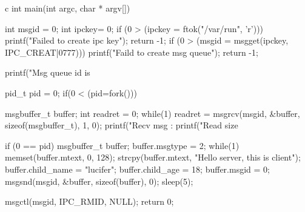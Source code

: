 \begin{code-block}{c}
int main(int argc, char * argv[])
{
        int msgid = 0;
        int ipckey= 0;
        if (0 > (ipckey = ftok("/var/run", 'r')))
        {
                printf("Failed to create ipc key\n");
                return -1;
        }
        if (0 > (msgid = msgget(ipckey, IPC_CREAT|0777)))
        {
                printf("Faild to create msg queue\n");
                return -1;
        }

        printf("Msg queue id is %

        pid_t pid = 0;
        if(0 < (pid=fork()))
        {
                msgbuffer_t buffer;
                int readret = 0;
                while(1)
                {
                        readret = msgrcv(msgid, &buffer,
                                sizeof(msgbuffer_t), 1, 0);
                        printf("Recv msg :%
                        printf("Read size %
                }

        }
        if (0 == pid)
        {
                msgbuffer_t buffer;
                buffer.msgtype = 2;
                while(1)
                {
                        memset(buffer.mtext, 0, 128);
                        strcpy(buffer.mtext,
                                "Hello server, this is client");
                        buffer.child_name = "lucifer";
                        buffer.child_age = 18;
                        buffer.msgid = 0;
                        msgsnd(msgid, &buffer, sizeof(buffer), 0);
                        sleep(5);
                }
        }

        msgctl(msgid, IPC_RMID, NULL);
        return 0;
}
\end{code-block}


